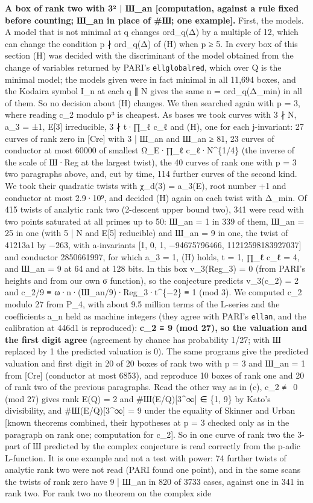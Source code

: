 \documentclass[11pt,a4paper]{article}
\theoremstyle{named}
\begin{document}
\textbf{A box of rank two with 3² | Ш\_an [computation, against a rule fixed before counting; Ш\_an in place of \#Ш; one example].} First, the models. A model that is not minimal at q changes ord\_q(Δ) by a multiple of 12, which can change the condition p ∤ ord\_q(Δ) of (H) when p ≥ 5. In every box of this section (H) was decided with the discriminant of the model obtained from the change of variables returned by PARI's \texttt{ellglobalred}, which over Q is the minimal model; the models given were in fact minimal in all 11,694 boxes, and the Kodaira symbol I\_n at each q ∥ N gives the same n = ord\_q(Δ\_min) in all of them. So no decision about (H) changes. We then searched again with p = 3, where reading c\_2 modulo p³ is cheapest. As bases we took curves with 3 ∤ N, a\_3 = ±1, E[3] irreducible, 3 ∤ t·∏\_ℓ c\_ℓ and (H), one for each j-invariant: 27 curves of rank zero in [Cre] with 3 | Ш\_an and Ш\_an ≥ 81, 23 curves of conductor at most 60000 of smallest Ω\_E·∏\_ℓ c\_ℓ·N\textasciicircum{}\{1/4\} (the inverse of the scale of Ш·Reg at the largest twist), the 40 curves of rank one with p = 3 two paragraphs above, and, cut by time, 114 further curves of the second kind. We took their quadratic twists with χ\_d(3) = a\_3(E), root number +1 and conductor at most 2.9·10⁹, and decided (H) again on each twist with Δ\_min. Of 415 twists of analytic rank two (2-descent upper bound two), 341 were read with two points saturated at all primes up to 50: Ш\_an = 1 in 339 of them, Ш\_an = 25 in one (with 5 | N and E[5] reducible) and Ш\_an = 9 in one, the twist of 41213a1 by −263, with a-invariants [1, 0, 1, −94675796466, 11212598183927037] and conductor 2850661997, for which a\_3 = 1, (H) holds, t = 1, ∏\_ℓ c\_ℓ = 4, and Ш\_an = 9 at 64 and at 128 bits. In this box v\_3(Reg\_3) = 0 (from PARI's heights and from our own σ function), so the conjecture predicts v\_3(c\_2) = 2 and c\_2/9 ≡ ω·n·(Ш\_an/9)·Reg\_3·t\textasciicircum{}\{−2\} ≡ 1 (mod 3). We computed c\_2 modulo 27 from P\_4, with about 9.5 million terms of the L-series and the coefficients a\_n held as machine integers (they agree with PARI's \texttt{ellan}, and the calibration at 446d1 is reproduced): \textbf{c\_2 ≡ 9 (mod 27), so the valuation and the first digit agree} (agreement by chance has probability 1/27; with Ш replaced by 1 the predicted valuation is 0). The same programs give the predicted valuation and first digit in 20 of 20 boxes of rank two with p = 3 and Ш\_an = 1 from [Cre] (conductor at most 6853), and reproduce 10 boxes of rank one and 20 of rank two of the previous paragraphs. Read the other way as in (c), c\_2 ≢ 0 (mod 27) gives rank E(Q) = 2 and \#Ш(E/Q)[3\textasciicircum{}∞] ∈ \{1, 9\} by Kato's divisibility, and \#Ш(E/Q)[3\textasciicircum{}∞] = 9 under the equality of Skinner and Urban [known theorems combined, their hypotheses at p = 3 checked only as in the paragraph on rank one; computation for c\_2]. So in one curve of rank two the 3-part of Ш predicted by the complex conjecture is read correctly from the p-adic L-function. It is one example and not a test with power: 74 further twists of analytic rank two were not read (PARI found one point), and in the same scans the twists of rank zero have 9 | Ш\_an in 820 of 3733 cases, against one in 341 in rank two. For rank two no theorem on the complex side 
\end{document}
